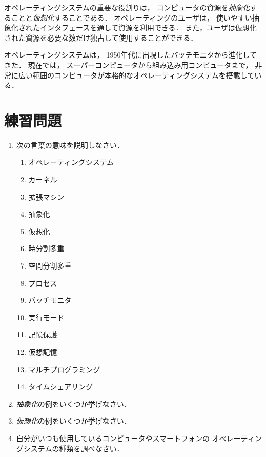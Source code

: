 オペレーティングシステムの重要な役割りは，
コンピュータの資源を\emph{抽象化}することと\emph{仮想化}することである．
オペレーティングのユーザは，
使いやすい抽象化されたインタフェースを通して資源を利用できる．
また，ユーザは仮想化された資源を必要な数だけ独占して使用することができる．

オペレーティングシステムは，
1950年代に出現したバッチモニタから進化してきた．
現在では，
スーパーコンピュータから組み込み用コンピュータまで，
非常に広い範囲のコンピュータが本格的なオペレーティングシステムを搭載している．

\section*{練習問題}
\begin{enumerate}
  \renewcommand{\labelenumi}{\ttfamily\arabic{chapter}.\arabic{enumi}}
  \setlength{\leftskip}{1em}
\item 次の言葉の意味を説明しなさい．
  \begin{enumerate}
    \item オペレーティングシステム
    \item カーネル
    \item 拡張マシン
    \item 抽象化
    \item 仮想化
    \item 時分割多重
    \item 空間分割多重
    \item プロセス
    \item バッチモニタ
    \item 実行モード
    \item 記憶保護
    \item 仮想記憶
    \item マルチプログラミング
    \item タイムシェアリング
  \end{enumerate}
\item \emph{抽象化}の例をいくつか挙げなさい．
\item \emph{仮想化}の例をいくつか挙げなさい．
\item 自分がいつも使用しているコンピュータやスマートフォンの
  オペレーティングシステムの種類を調べなさい．
\end{enumerate}
